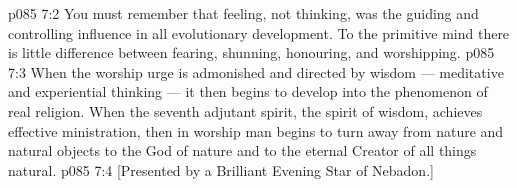 \vs p085 7:2 You must remember that feeling, not thinking, was the guiding and controlling influence in all evolutionary development. To the primitive mind there is little difference between fearing, shunning, honouring, and worshipping.
\vs p085 7:3 When the worship urge is admonished and directed by wisdom --- meditative and experiential thinking --- it then begins to develop into the phenomenon of real religion. When the seventh adjutant spirit, the spirit of wisdom, achieves effective ministration, then in worship man begins to turn away from nature and natural objects to the God of nature and to the eternal Creator of all things natural.
\vsetoff
\vs p085 7:4 [Presented by a Brilliant Evening Star of Nebadon.]
\quizlink
